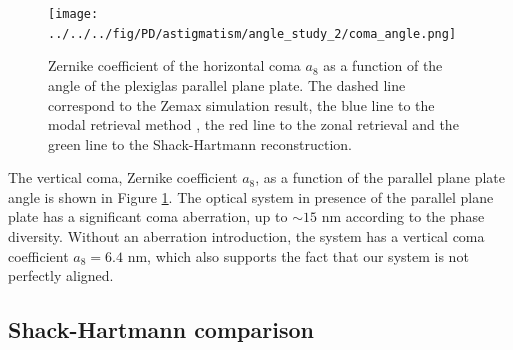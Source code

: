 \begin{figure}
\begin{center}
\texttt{[image: ../../../fig/PD/astigmatism/angle\_study\_2/coma\_angle.png]}
\decoRule
\caption{Zernike coefficient of the horizontal coma $a_8$ as a function of the angle of the plexiglas parallel plane plate. The dashed line correspond to the Zemax simulation result, the blue line to the modal retrieval method , the red line to the zonal retrieval and the green line to the Shack-Hartmann reconstruction.}
\label{fig:a8astigmatism_angle_Diversity}
\end{center}
\end{figure}

The vertical coma, Zernike coefficient $a_8$, as a function of the parallel plane plate angle is shown in Figure \ref{fig:a8astigmatism_angle_Diversity}. The optical system in presence of the parallel plane plate has a significant coma aberration, up to $\sim15$ nm according to the phase diversity. Without an aberration introduction, the system has a vertical coma coefficient $a_8=6.4$ nm, which also supports the fact that our system is not perfectly aligned. 

\subsection{Shack-Hartmann comparison}

